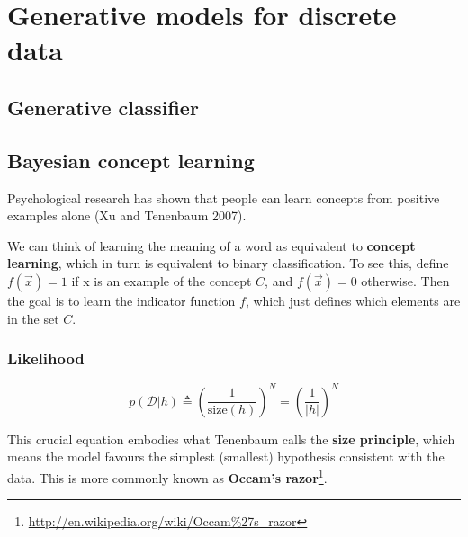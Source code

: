 \chapter{Generative models for discrete data}

\section{Generative classifier}
%


\section{Bayesian concept learning}
Psychological research has shown that people can learn concepts from positive examples alone (Xu and Tenenbaum 2007).

We can think of learning the meaning of a word as equivalent to \textbf{concept learning}, which in turn is equivalent to binary classification. To see this, define $f(\vec{x})=1$ if x is an example of the concept $C$, and $f(\vec{x})=0$ otherwise. Then the goal is to learn the indicator function $f$, which just defines which elements are in the set $C$.


\subsection{Likelihood}
\begin{equation}
p(\mathcal{D}|h) \triangleq \left(\dfrac{1}{\text{size}(h)}\right)^N=\left(\dfrac{1}{|h|}\right)^N
\end{equation}

This crucial equation embodies what Tenenbaum calls the \textbf{size principle}, which means the model favours the simplest (smallest) hypothesis consistent with the data. This is more commonly known as \textbf{Occam’s razor}\footnote{\url{http://en.wikipedia.org/wiki/Occam\%27s_razor}}.


